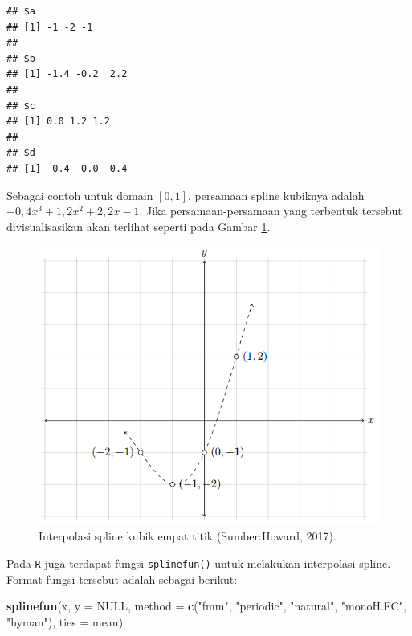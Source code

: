\documentclass[
]{book}
\newenvironment{Shaded}{\begin{snugshade}}{\end{snugshade}}
\newcommand{\AttributeTok}[1]{\textcolor[rgb]{0.13,0.29,0.53}{#1}}
\newcommand{\ConstantTok}[1]{\textcolor[rgb]{0.56,0.35,0.01}{#1}}
\newcommand{\FunctionTok}[1]{\textcolor[rgb]{0.13,0.29,0.53}{\textbf{#1}}}
\newcommand{\NormalTok}[1]{#1}
\newcommand{\StringTok}[1]{\textcolor[rgb]{0.31,0.60,0.02}{#1}}
\theoremstyle{definition}
\theoremstyle{definition}
\theoremstyle{definition}
\theoremstyle{definition}
\theoremstyle{remark}
\begin{document}
\begin{verbatim}
## $a
## [1] -1 -2 -1
## 
## $b
## [1] -1.4 -0.2  2.2
## 
## $c
## [1] 0.0 1.2 1.2
## 
## $d
## [1]  0.4  0.0 -0.4
\end{verbatim}

Sebagai contoh untuk domain \(\left[0,1\right]\), persamaan spline kubiknya adalah \(-0,4x^3+1,2x^2+2,2x-1\). Jika persamaan-persamaan yang terbentuk tersebut divisualisasikan akan terlihat seperti pada Gambar \ref{fig:cubicsplineviz}.

\begin{figure}

{\centering \includegraphics[width=0.8\linewidth]{./images/cubicsplineviz} 

}

\caption{Interpolasi spline kubik empat titik 
(Sumber:Howard, 2017).}\label{fig:cubicsplineviz}
\end{figure}

Pada \texttt{R} juga terdapat fungsi \texttt{splinefun()} untuk melakukan interpolasi spline. Format fungsi tersebut adalah sebagai berikut:

\begin{Shaded}
\begin{Highlighting}[]
\FunctionTok{splinefun}\NormalTok{(x, }\AttributeTok{y =} \ConstantTok{NULL}\NormalTok{,}
          \AttributeTok{method =} \FunctionTok{c}\NormalTok{(}\StringTok{"fmm"}\NormalTok{, }\StringTok{"periodic"}\NormalTok{, }\StringTok{"natural"}\NormalTok{, }\StringTok{"monoH.FC"}\NormalTok{, }\StringTok{"hyman"}\NormalTok{),}
          \AttributeTok{ties =}\NormalTok{ mean)}
\end{Highlighting}
\end{Shaded}
\end{document}
